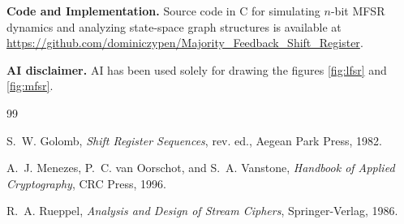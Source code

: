 \documentclass[11pt,reqno]{amsart}
\theoremstyle{definition}
\begin{document}
{\bf Code and Implementation.}
Source code in C for simulating $n$-bit MFSR dynamics and analyzing 
state-space graph structures is available 
at \url{https://github.com/dominiczypen/Majority_Feedback_Shift_Register}.

\vspace*{3mm}

{\bf AI disclaimer.} AI has been used solely for drawing the
figures \ref{fig:lfsr} and \ref{fig:mfsr}.


\begin{thebibliography}{99}

S.~W. Golomb, \emph{Shift Register Sequences}, rev. ed., Aegean Park Press, 1982.

A.~J. Menezes, P.~C. van Oorschot, and S.~A. Vanstone, \emph{Handbook of Applied Cryptography}, CRC Press, 1996.

R.~A. Rueppel, \emph{Analysis and Design of Stream Ciphers}, Springer-Verlag, 1986.

\end{thebibliography}
\end{document}
